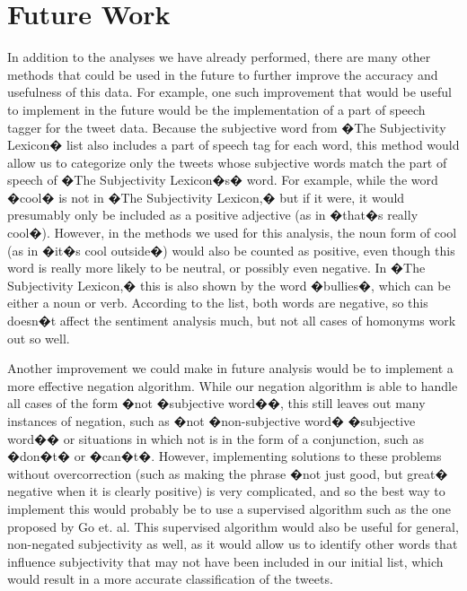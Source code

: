 \documentclass[11pt]{article}
\begin{document}
\section{Future Work}
In addition to the analyses we have already performed, there are many other methods that could be used in the future to further improve the accuracy and usefulness of this data.  For example, one such improvement that would be useful to implement in the future would be the implementation of a part of speech tagger for the tweet data.  Because the subjective word from �The Subjectivity Lexicon� list also includes a part of speech tag for each word, this method would allow us to categorize only the tweets whose subjective words match the part of speech of �The Subjectivity Lexicon�s� word.  For example, while the word �cool� is not in �The Subjectivity Lexicon,� but if it were, it would presumably only be included as a positive adjective (as in �that�s really cool�).  However, in the methods we used for this analysis, the noun form of cool (as in �it�s cool outside�) would also be counted as positive, even though this word is really more likely to be neutral, or possibly even negative.  In �The Subjectivity Lexicon,� this is also shown by the word �bullies�, which can be either a noun or verb.  According to the list, both words are negative, so this doesn�t affect the sentiment analysis much, but not all cases of homonyms work out so well.

Another improvement we could make in future analysis would be to implement a more effective negation algorithm.  While our negation algorithm is able to handle all cases of the form �not �subjective word��, this still leaves out many instances of negation, such as �not �non-subjective word� �subjective word�� or situations in which not is in the form of a conjunction, such as �don�t� or �can�t�.  However, implementing solutions to these problems without overcorrection (such as making the phrase �not just good, but great� negative when it is clearly positive) is very complicated, and so the best way to implement this would probably be to use a supervised algorithm such as the one proposed by Go et. al.   This supervised algorithm would also be useful for general, non-negated subjectivity as well, as it would allow us to identify other words that influence subjectivity that may not have been included in our initial list, which would result in a more accurate classification of the tweets.
\end{document}
